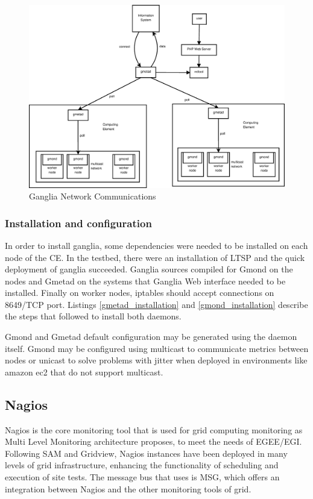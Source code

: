 \begin{figure}[htb]
\centering
 \includegraphics[width=130mm]{images/ganglia_data_flow.eps}
\caption{Ganglia Network Communications}
\label{figure:ganglia_network}
\end{figure}

\subsubsection{Installation and configuration}

In order to install ganglia, some dependencies were needed to be installed on each node of the \ac{CE}. In the testbed, there were an installation of \ac{LTSP} \cite{ltsp} and the quick deployment of ganglia succeeded. Ganglia sources compiled for Gmond on the nodes and Gmetad on the systems that Ganglia Web interface needed to be installed. Finally on worker nodes, iptables should accept connections on 8649/TCP port. Listings \ref{gmetad_installation} and \ref{gmond_installation} describe the steps that followed to install both daemons.

Gmond and Gmetad default configuration may be generated using the daemon itself. Gmond may be configured using multicast to communicate metrics between nodes or unicast to solve problems with jitter when deployed in environments like amazon ec2 that do not support multicast.

\subsection{Nagios}

Nagios is the core monitoring tool that is used for grid computing monitoring as Multi Level Monitoring architecture proposes, to meet the needs of EGEE/EGI. Following \ac{SAM} and Gridview, Nagios instances have been deployed in many levels of grid infrastructure, enhancing the functionality of scheduling and execution of site tests. The message bus that uses is MSG, which offers an integration between Nagios and the other monitoring tools of grid.

